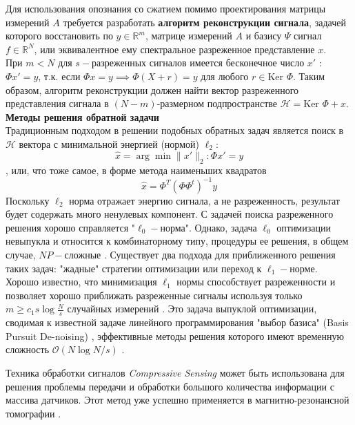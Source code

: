 \documentclass[14pt]{matmex-diploma}
\begin{document}
Для использования опознания со сжатием помимо проектирования матрицы измерений $A$ требуется разработать \textbf{алгоритм реконструкции сигнала}, задачей которого восстановить по $y \in \mathbb{R}^m$, матрице измерений $A$ и базису $\Psi$ сигнал $f \in \mathbb{R}^N$, или эквивалентное ему спектральное разреженное представление $x$.\\
При $m < N$ для $s-$разреженных сигналов имеется бесконечное число $x'$ : $\Phi x' = y$, т.к. если $\Phi x = y \implies \Phi(X+r) = y$ для любого $r \in \text{Ker }\Phi$. Таким образом, алгоритм реконструкции должен найти вектор разреженного представления сигнала в $(N - m)$-размерном подпространстве $\mathcal{H}=\text{Ker }\Phi + x$.\\
\textbf{Методы решения обратной задачи}\\
Традиционным подходом в решении подобных обратных задач является поиск в $\mathcal{H}$ вектора с минимальной энергией (нормой)  $\ell_2$: $$ \hat{x} = \arg\!\min{\| x'\|_2} : \Phi x' = y$$, или, что тоже самое, в форме метода наименьших квадратов 
$$\hat{x} = \Phi^T (\Phi\Phi^t)^{-1}y$$
Поскольку $\ell_2$ норма  отражает энергию сигнала, а не разреженность, результат будет содержать много ненулевых компонент. С задачей поиска разреженного решения хорошо справляется "$\ell_0-$норма". Однако, задача $\ell_0$ оптимизации невыпукла и относится к комбинаторному типу, процедуры ее решения, в общем случае, $NP-$сложные \cite{natarajan1995sparse}. Существует два подхода для приближенного решения таких задач: "жадные" стратегии оптимизации\cite{mallat1993matching} или переход к $\ell_1-$норме. Хорошо известно, что минимизация $\ell_1$ нормы способствует разреженности \cite{donoho2006most} и позволяет хорошо приближать разреженные сигналы используя только $m \geq c_1 s \log{\frac{N}{s}}$ случайных измерений \cite{donoho2006compressed}\cite{candes2006robust}. Это задача выпуклой оптимизации, сводимая к известной задаче линейного программирования "выбор базиса" (Basis Pursuit De-noising) \cite{chen2001atomic}, эффективные методы решения которого имеют временную сложность $\mathcal{O}(N\log{N/s})$ \cite{berinde2008practical}.




Техника обработки сигналов \textit{Compressive Sensing} может быть использована для решения проблемы передачи и обработки большого количества информации с массива датчиков. Этот метод уже успешно применяется в магнитно-резонансной томографии \cite{lustig2008compressed}\cite{lustig2007sparse}.
\end{document}
